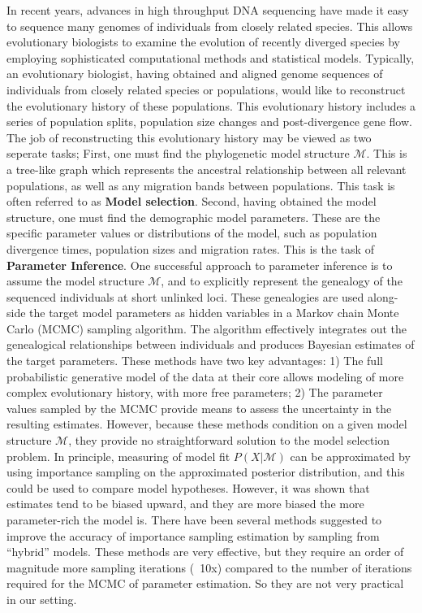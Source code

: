 \documentclass[11pt]{article}
\newcommand{\M}{\mathcal{M}}
\newcommand{\1}{\mathbbm{1}}
\begin{document}
In recent years, advances in high throughput DNA sequencing have made it easy to sequence many genomes of individuals from closely related species. This allows evolutionary biologists to examine the evolution of recently diverged species by employing sophisticated computational methods and statistical models.
%
Typically, an evolutionary biologist, having obtained and aligned genome sequences of individuals from closely related species or populations, would like to reconstruct the evolutionary history of these populations. This evolutionary history includes a series of population splits, population size changes and post-divergence gene flow.\\
%
The job of reconstructing this evolutionary history may be viewed as two seperate tasks; First, one must find the phylogenetic model structure $\M$. This is a tree-like graph which represents the ancestral relationship between all relevant populations, as well as any migration bands between populations. This task is often referred to as \textbf{Model selection}. Second, having obtained the model structure, one must find the demographic model parameters. These are the specific parameter values or distributions of the model, such as population divergence times, population sizes and migration rates. This is the task of \textbf{Parameter Inference}.
%
One successful approach to parameter inference is to assume the model structure $\M$, and to explicitly represent the genealogy of the sequenced individuals at short unlinked loci. These genealogies are used along-side the target model parameters as hidden variables in a Markov chain Monte Carlo (MCMC) sampling algorithm. The algorithm effectively integrates out the genealogical relationships between individuals and produces Bayesian estimates of the target parameters.
%
These methods have two key advantages: 1) The full probabilistic generative model of the data at their core allows modeling of 	more complex evolutionary history, with more free parameters; 2) The parameter values sampled by the MCMC provide means to assess the uncertainty in the resulting estimates.
%
However, because these methods condition on a given model structure $\M$, they provide no straightforward solution to the model selection problem.
%
In principle, measuring of model fit $P(X|\M)$ can be approximated by using importance sampling on the approximated posterior distribution, and this could be used to compare model hypotheses.
%
However, it was shown that estimates tend to be biased upward, and they are more biased the more parameter-rich the model is. 
%
There have been several methods suggested to improve the accuracy of importance sampling estimation by sampling from ``hybrid'' models.
%
These methods are very effective, but they require an order of magnitude more sampling iterations (~10x) compared to the number of iterations required for the MCMC of parameter estimation. So they are not very practical in our setting.
\end{document}

